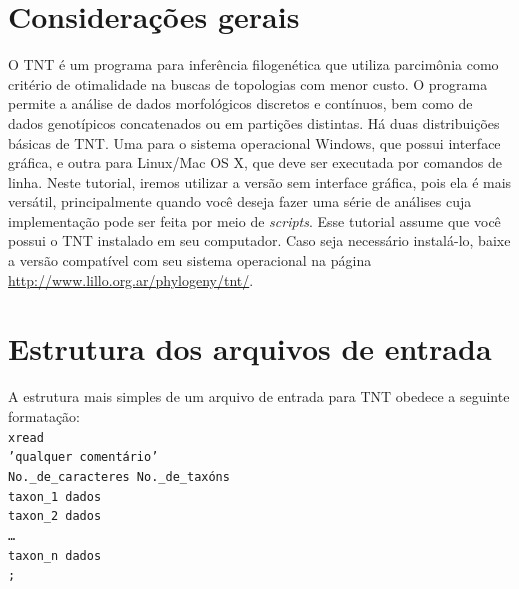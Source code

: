 \newpage
\pagestyle{fancy} %
\begin{refsection}
\renewcommand*{\finalnamedelim}{\addspace\&\space}%

\section{Considerações gerais}\label{tut4:general}

	O TNT \parencite{GoloboffEtAl_2008} é um programa para inferência filogenética que utiliza parcimônia como critério de otimalidade na buscas de topologias com menor custo. O programa permite a análise de dados morfológicos discretos e contínuos, bem como de dados genotípicos concatenados ou em partições distintas. Há duas distribuições básicas de TNT. Uma para o sistema operacional Windows, que possui interface gráfica, e outra para Linux/Mac OS X, que deve ser executada por comandos de linha. Neste tutorial, iremos utilizar a versão sem interface gráfica, pois ela é mais versátil, principalmente quando você deseja fazer uma série de análises cuja implementação pode ser feita por meio de \textit{scripts}. Esse tutorial assume que você possui o TNT instalado em seu computador. Caso seja necessário instalá-lo, baixe a versão compatível com seu sistema operacional na página \url{http://www.lillo.org.ar/phylogeny/tnt/}.

\section{Estrutura dos arquivos de entrada}\label{tut4:input}
	A estrutura mais simples de um arquivo de entrada para TNT obedece a seguinte formatação:
\\
\indent\indent\texttt{xread}\\
\indent\indent\texttt{'qualquer comentário'}\\
\indent\indent\texttt{No.\_de\_caracteres  No.\_de\_taxóns}\\
\indent\indent\texttt{taxon\_1   dados}\\
\indent\indent\texttt{taxon\_2   dados}\\
\indent\indent\texttt{…}\\
\indent\indent\texttt{taxon\_n   dados}\\
\indent\indent\texttt{;}\\


\end{refsection}
